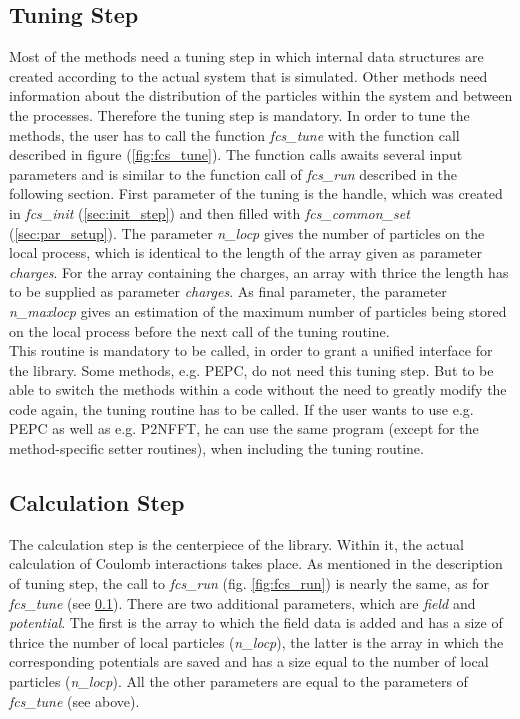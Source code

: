 \subsection{Tuning Step}
\label{sec:tune_step}



Most of the methods need a tuning step in which internal data structures are created according to the actual system that is simulated. Other methods
need information about the distribution of the particles within the system and between the processes. Therefore the tuning step is mandatory. In order
to tune the methods, the user has to call the function \textit{fcs\_tune} with the function call described in figure (\ref{fig:fcs_tune}). The function
calls awaits several input parameters and is similar to the function call of \textit{fcs\_run} described in the following section. First parameter of the
tuning is the handle, which was created in \textit{fcs\_init} (\ref{sec:init_step}) and then filled with \textit{fcs\_common\_set} (\ref{sec:par_setup}).
The parameter \textit{n\_locp} gives the number of particles on the local process, which is identical to the length of the array given as parameter 
\textit{charges}. For the array containing the charges, an array with thrice the length has to be supplied as parameter \textit{charges}. As final parameter,
the parameter \textit{n\_maxlocp} gives an estimation of the maximum number of particles being stored on the local process before the next call of the tuning
routine.\\
This routine is mandatory to be called, in order to grant a unified interface for the library. Some methods, e.g. PEPC, do not need this tuning step. But to be
able to switch the methods within a code without the need to greatly modify the code again, the tuning routine has to be called. If the user wants to use e.g. PEPC
as well as e.g. P2NFFT, he can use the same program (except for the method-specific setter routines), when including the tuning routine. 

\subsection{Calculation Step}
\label{sec:run_step}



The calculation step is the centerpiece of the library. Within it, the actual calculation of Coulomb interactions takes place. As mentioned in the description of tuning step,
the call to \textit{fcs\_run} (fig. \ref{fig:fcs_run}) is nearly the same, as for \textit{fcs\_tune} (see \ref{sec:tune_step}). There are two additional parameters, which are \textit{field} and
\textit{potential}. The first is the array to which the field data is added and has a size of thrice the number of local particles (\textit{n\_locp}), the latter
is the array in which the corresponding potentials are saved and has a size equal to the number of local particles (\textit{n\_locp}). All the other parameters
are equal to the parameters of \textit{fcs\_tune} (see above).


